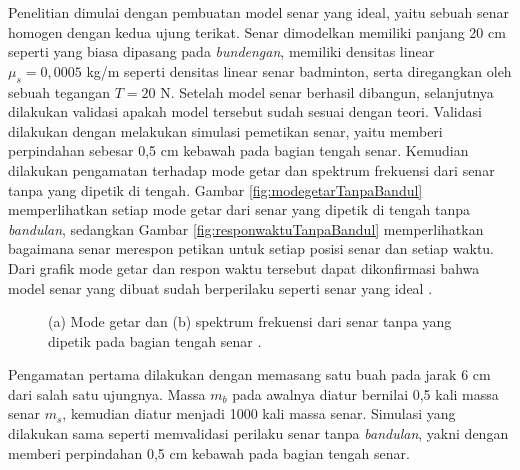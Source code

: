 Penelitian dimulai dengan pembuatan model senar yang ideal, yaitu sebuah senar homogen dengan kedua ujung terikat. Senar dimodelkan memiliki panjang 20 cm seperti yang biasa dipasang pada \textit{bundengan}, memiliki densitas linear $\mu_s=0,0005$ kg/m seperti densitas linear senar badminton, serta diregangkan oleh sebuah tegangan $T=20$ N. Setelah model senar berhasil dibangun, selanjutnya dilakukan validasi apakah model tersebut sudah sesuai dengan teori. Validasi dilakukan dengan melakukan simulasi pemetikan senar, yaitu memberi perpindahan sebesar 0,5 cm kebawah pada bagian tengah senar. Kemudian dilakukan pengamatan terhadap mode getar dan spektrum frekuensi dari senar tanpa \bandulan yang dipetik di tengah. Gambar \ref{fig:modegetarTanpaBandul} memperlihatkan setiap mode getar dari senar yang dipetik di tengah tanpa \textit{bandulan}, sedangkan Gambar \ref{fig:responwaktuTanpaBandul} memperlihatkan bagaimana senar merespon petikan untuk setiap posisi senar dan setiap waktu. Dari grafik mode getar dan respon waktu tersebut dapat dikonfirmasi bahwa model senar yang dibuat sudah berperilaku seperti senar yang ideal \cite{bukuFletcher}. \par 
\begin{figure}[t!]
    \centering
    \hspace{1 cm}
    \caption{(a) Mode getar dan (b) spektrum frekuensi dari senar \bundengan tanpa \bandulan yang dipetik pada bagian tengah senar \cite{paperGetaranBandulan}.}
    \label{fig:senarTanpaBandulan}
\end{figure}
Pengamatan pertama dilakukan dengan memasang satu buah \bandulan pada jarak 6 cm dari salah satu ujungnya. Massa \bandulan $m_b$ pada awalnya diatur bernilai 0,5 kali massa senar $m_s$, kemudian diatur menjadi 1000 kali massa senar. Simulasi yang dilakukan sama seperti memvalidasi perilaku senar tanpa \textit{bandulan}, yakni dengan memberi perpindahan 0,5 cm kebawah pada bagian tengah senar. \par 

